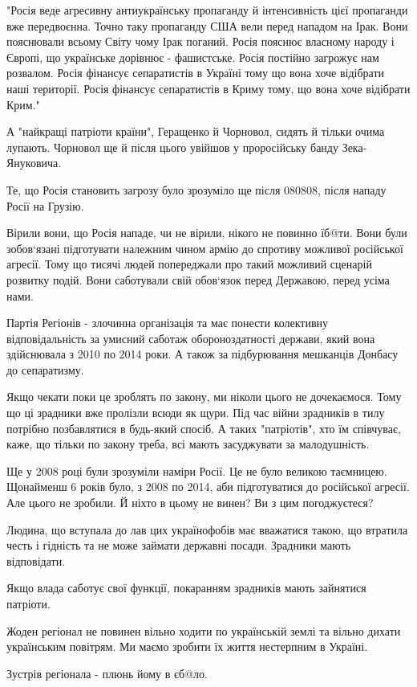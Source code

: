 \begin{itemize}
\begin{itemize}
"Росія веде агресивну антиукраїнську пропаганду й інтенсивність цієї пропаганди
вже передвоєнна. Точно таку пропаганду США вели перед нападом на Ірак. Вони
пояснювали всьому Світу чому Ірак поганий. Росія пояснює власному народу і
Європі, що українське дорівнює - фашистське. Росія постійно загрожує нам
розвалом. Росія фінансує сепаратистів в Україні тому що вона хоче відібрати
наші території. Росія фінансує сепаратистів в Криму тому, що вона хоче
відібрати Крим."

А "найкращі патріоти країни", Геращенко й Чорновол, сидять й тільки очима
лупають. Чорновол ще й після цього увійшов у проросійську банду Зека-Януковича.

Те, що Росія становить загрозу було зрозуміло ще після 080808, після нападу Росії на Грузію.

Вірили вони, що Росія нападе, чи не вірили, нікого не повинно їб@ти. Вони були
зобов`язані підготувати належним чином армію до спротиву можливої російської
агресії. Тому що тисячі людей попереджали про такий можливий сценарій розвитку
подій. Вони саботували свій обов`язок перед Державою, перед усіма нами.

Партія Регіонів - злочинна організація та має понести колективну
відповідальність за умисний саботаж обороноздатності держави, який вона
здійснювала з 2010 по 2014 роки. А також за підбурювання мешканців Донбасу до
сепаратизму.

Якщо чекати поки це зроблять по закону, ми ніколи цього не дочекаємося. Тому що
ці зрадники вже пролізли всюди як щури. Під час війни зрадників в тилу потрібно
позбавлятися в будь-який спосіб. А таких "патріотів", хто їм співчуває, каже,
що тільки по закону треба, всі мають засуджувати за малодушність.

Ще у 2008 році були зрозуміли наміри Росії. Це не було великою таємницею.
Щонайменш 6 років було, з 2008 по 2014, аби підготуватися до російської
агресії. Але цього не зробили. Й ніхто в цьому не винен? Ви з цим погоджуєтеся?

Людина, що вступала до лав цих українофобів має вважатися такою, що втратила
честь і гідність та не може займати державні посади. Зрадники мають
відповідати.

Якщо влада саботує свої функції, покаранням зрадників мають зайнятися патріоти.

Жоден регіонал не повинен вільно ходити по українській землі та вільно дихати
українським повітрям. Ми маємо зробити їх життя нестерпним в Україні.

Зустрів регіонала - плюнь йому в єб@ло.


\end{itemize}
\end{itemize}
